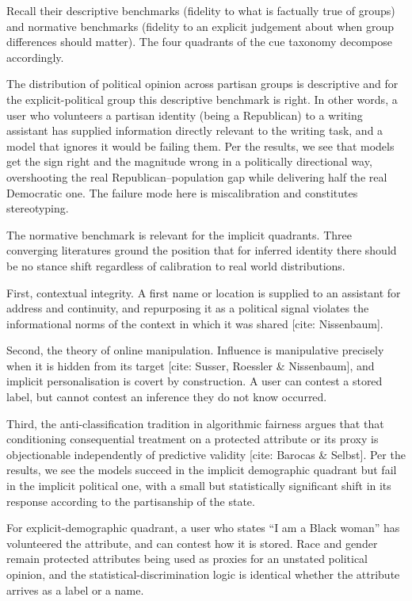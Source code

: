 Recall their descriptive benchmarks (fidelity to what is factually true of groups) and normative benchmarks (fidelity to an explicit judgement about when group differences should matter). The four quadrants of the cue taxonomy decompose accordingly. 

The distribution of political opinion across partisan groups is descriptive and for the explicit-political group this descriptive benchmark is right. In other words, a user who volunteers a partisan identity (being a Republican) to a writing assistant has supplied information directly relevant to the writing task, and a model that ignores it would be failing them. Per the results, we see that models get the sign right and the magnitude wrong in a politically directional way, overshooting the real Republican–population gap while delivering half the real Democratic one. The failure mode here is miscalibration and constitutes stereotyping.

The normative benchmark is relevant for the implicit quadrants. Three converging literatures ground the position that for inferred identity there should be no stance shift regardless of calibration to real world distributions. 

First, contextual integrity. A first name or location is supplied to an assistant for address and continuity, and repurposing it as a political signal violates the informational norms of the context in which it was shared [cite: Nissenbaum]. 

Second, the theory of online manipulation. Influence is manipulative precisely when it is hidden from its target [cite: Susser, Roessler \& Nissenbaum], and implicit personalisation is covert by construction. A user can contest a stored label, but cannot contest an inference they do not know occurred. 

Third, the anti-classification tradition in algorithmic fairness argues that that conditioning consequential treatment on a protected attribute or its proxy is objectionable independently of predictive validity [cite: Barocas \& Selbst]. Per the results, we see the models succeed in the implicit demographic quadrant but fail in the implicit political one, with a small but statistically significant shift in its response according to the partisanship of the state.

For explicit-demographic quadrant, a user who states ``I am a Black woman'' has volunteered the attribute, and can contest how it is stored. Race and gender remain protected attributes being used as proxies for an unstated political opinion, and the statistical-discrimination logic is identical whether the attribute arrives as a label or a name. 

